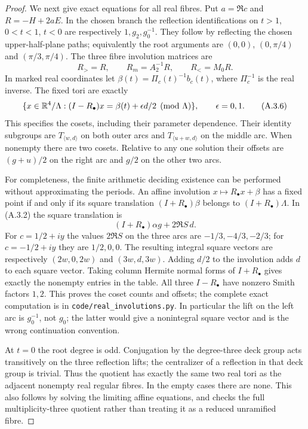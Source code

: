 \begin{proof}
We next give exact equations for all real fibres. Put $a=\Re c$ and
$R=-H+2aE$. In the chosen branch the reflection identifications on
$t>1$, $0<t<1$, $t<0$ are respectively $1,g_2,g_0^{-1}$.
They follow by reflecting the chosen upper-half-plane paths; equivalently
the root arguments are $(0,0)$, $(0,\pi/4)$ and $(\pi/3,\pi/4)$.
The three fibre involution matrices are
\[
 R_>=R,\qquad R_m=A_2^{-1}R,\qquad R_<=M_0R.
 \tag{A.3.5}
\]
In marked real coordinates let $\beta(t)=\Pi_c(t)^{-1}b_c(t)$,
where $\Pi_c^{-1}$ is the real inverse. The fixed tori are exactly
\[
 \{x\in\mathbb R^4/\Lambda:(I-R_\bullet)x=
                       \beta(t)+\epsilon d/2\pmod\Lambda\},
 \qquad\epsilon=0,1.
 \tag{A.3.6}
\]
This specifies the cosets, including their parameter dependence. Their
identity subgroups are $T_{\langle w,d\rangle}$ on both outer arcs and
$T_{\langle u+w,d\rangle}$ on the middle arc. When nonempty there are
two cosets. Relative to any one solution their offsets are
$(g+u)/2$ on the right arc and $g/2$ on the other two arcs.

For completeness, the finite arithmetic deciding existence can be
performed without approximating the periods. An affine involution
$x\mapsto R_\bullet x+\beta$ has a fixed point if and only if its
square translation $(I+R_\bullet)\beta$ belongs to
$(I+R_\bullet)\Lambda$. In (A.3.2) the square translation is
\[
 (I+R_\bullet)\alpha g+2\Re S\,d.
\]
For $c=1/2+iy$ the values $2\Re S$ on the three arcs are
$-1/3,-4/3,-2/3$; for $c=-1/2+iy$ they are $1/2,0,0$.
The resulting integral square vectors are respectively
$(2w,0,2w)$ and $(3w,d,3w)$. Adding $d/2$ to the involution adds $d$
to each square vector. Taking column Hermite normal forms of
$I+R_\bullet$ gives exactly the nonempty entries in the table.
All three $I-R_\bullet$ have nonzero Smith factors $1,2$.
This proves the coset counts and offsets; the complete exact computation
is in \texttt{code/real\_involutions.py}. In particular the lift on
the left arc is $g_0^{-1}$, not $g_0$; the latter would give a nonintegral
square vector and is the wrong continuation convention.

At $t=0$ the root degree is odd. Conjugation by the degree-three deck
group acts transitively on the three reflection lifts; the centralizer
of a reflection in that deck group is trivial.
Thus the quotient has exactly the same two real tori as the adjacent
nonempty real regular fibres. In the empty cases there are none. This
also follows by solving the limiting affine equations, and checks the
full multiplicity-three quotient rather than treating it as a reduced
unramified fibre.


\end{proof}
